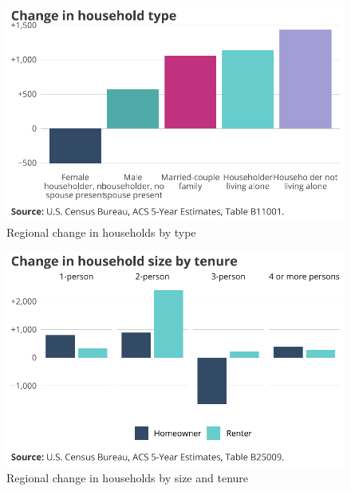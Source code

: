 \documentclass[
  letterpaper,
  DIV=11,
  numbers=noendperiod]{scrreprt}
\begin{document}
\begin{figure}[H]

{\centering \includegraphics{./part-3-1_files/figure-pdf/fig-hhtype-1.pdf}

}

\caption{\label{fig-hhtype}Regional change in households by type}

\end{figure}

\begin{figure}[H]

{\centering \includegraphics{./part-3-1_files/figure-pdf/fig-hhsize-1.pdf}

}

\caption{\label{fig-hhsize}Regional change in households by size and
tenure}

\end{figure}
\end{document}
